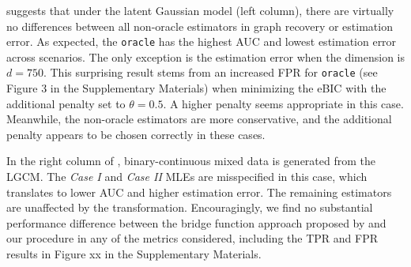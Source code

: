  suggests that under the latent Gaussian model (left column), there are virtually no differences between all non-oracle estimators in graph recovery or estimation error. As expected, the \texttt{oracle} has the highest AUC and lowest estimation error across scenarios. The only exception is the estimation error when the dimension is \(d = 750\). This surprising result stems from an increased FPR for \texttt{oracle} (see Figure 3 in the Supplementary Materials) when minimizing the eBIC with the additional penalty set to $\theta = 0.5$. A higher penalty seems appropriate in this case. Meanwhile, the non-oracle estimators are more conservative, and the additional penalty appears to be chosen correctly in these cases.

In the right column of , binary-continuous mixed data is generated from the LGCM. The \textit{Case I} and \textit{Case II} MLEs are misspecified in this case, which translates to lower AUC and higher estimation error.
The remaining estimators are unaffected by the transformation. Encouragingly, we find no substantial performance difference between the bridge function approach proposed by \cite{Fan17} and our procedure in any of the metrics considered, including the TPR and FPR results in Figure xx in the Supplementary Materials.

